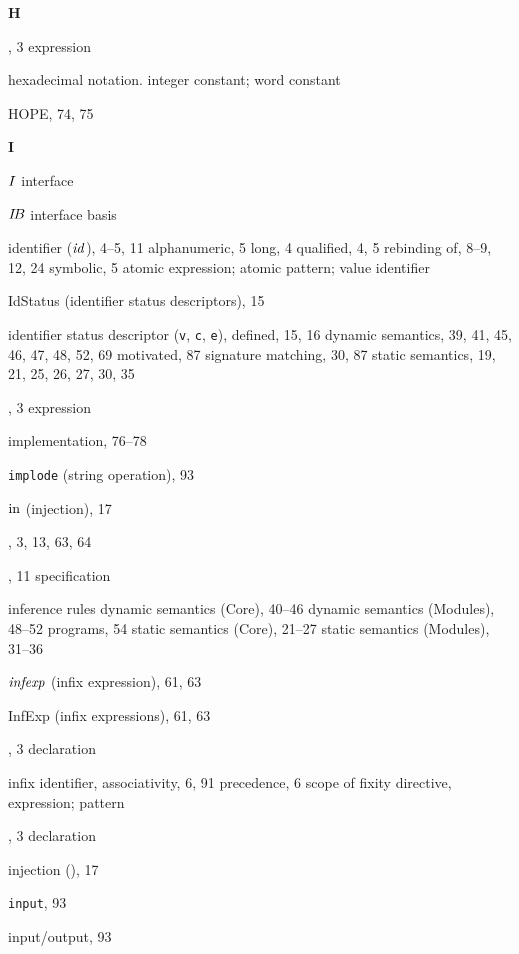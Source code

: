 \begin{theindex}
\indexspace
\parbox{65mm}{\hfil{\large\bf H}\hfil}
\indexspace
\item \HANDLE, 3
\subitem \seealso expression
\item hexadecimal notation. \see integer constant; word constant
\item HOPE, 74, 75
\indexspace
\parbox{65mm}{\hfil{\large\bf I}\hfil}
\indexspace
\item $I$ \see interface
\item $\mbox{$I\!B$}$ \see interface basis
\item identifier (${\it id}$), 4--5, 11
\subitem alphanumeric, 5
\subitem long, 4 
\subitem qualified, 4, 5
\subitem rebinding of, 8--9, 12, 24
\subitem symbolic, 5
\subitem \seealso  atomic expression; atomic pattern; value identifier
\item IdStatus (identifier status descriptors), 15
\item identifier status descriptor ({\tt v}, {\tt c}, {\tt e}), 
\subitem defined, 15, 16
\subitem dynamic semantics, 39, 41, 45, 46, 47, 48, 52, 69
\subitem motivated, 87
\subitem signature matching, 30, 87
\subitem static semantics, 19, 21, 25, 26, 27, 30, 35
\item \IF, 3
\subitem \seealso expression
\item implementation, 76--78
\item {\tt implode} (string operation), 93
\item $\mbox{\rm in}$ (injection), 17
\item \IN, 3, 13, 63, 64
\item \INCLUDE, 11
\subitem \seealso specification
\item inference rules 
\subitem dynamic semantics (Core), 40--46
\subitem dynamic semantics (Modules), 48--52
\subitem programs, 54
\subitem static semantics (Core), 21--27
\subitem static semantics (Modules), 31--36
\item ${\it infexp}$ (infix expression), 61, 63
\item InfExp (infix expressions), 61, 63
\item \INFIX, 3
\subitem \seealso declaration
\item infix identifier, \infixapplrefs
\subitem associativity, 6, 91
\subitem precedence, 6
\subitem scope of fixity directive, \scopefixityrefs
\subitem \seealso expression; pattern
\item \INFIXR, 3
\subitem \seealso declaration
\item injection (\In), 17
\item {\tt input}, 93
\item input/output, 93

\end{theindex}
